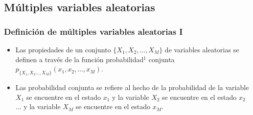 


\subsection{Múltiples variables aleatorias}



\begin{frame}
\frametitle{Definición de múltiples variables aleatorias I}

\vspace{-0.2cm}

\footnotesize

\begin{itemize}
\item Las propiedades de un conjunto $\{X_1,X_2,\dots,X_M\}$ de variables aleatorias se definen a través de la función probabilidad$^1$ conjunta $p_{\{X_1,X_2\dots,X_M\}}(x_1,x_2,\dots,x_M)$.

\vspace{0.1cm}

\item Las probabilidad conjunta se refiere al hecho de la probabilidad de la variable $X_1$ se encuentre en el estado $x_1$ y la variable $X_2$ se encuentre en el estado $x_2$ ... y la variable $X_M$ se encuentre en el estado $x_M$.

\begin{itemize}
\footnotesize

\vspace{0.1cm}



\end{itemize}
\end{itemize}
\end{frame}
